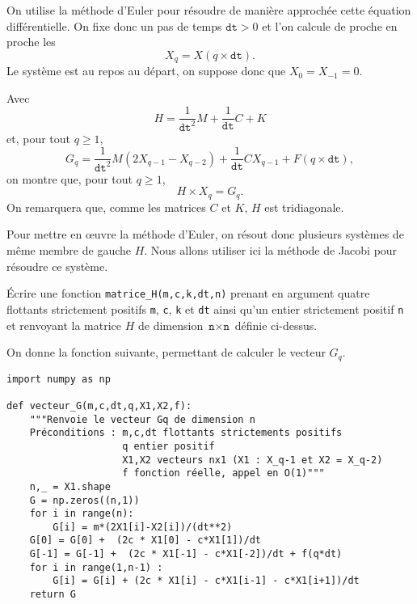On utilise la méthode d'Euler pour résoudre de manière approchée cette équation différentielle. On fixe donc un pas de temps $\texttt{dt} > 0$ et l'on calcule de proche en proche les 
\begin{equation*}
  X_q = X(q \times \texttt{dt}).
\end{equation*}
Le système est au repos au départ, on suppose donc que $X_0 = X_{-1} = 0$.

Avec
\begin{equation*}
  H = \dfrac{1}{\texttt{dt}^2} M + \dfrac{1}{\texttt{dt}}C + K
\end{equation*}
et, pour tout $q \geq 1$,
\begin{equation*}
  G_q = \dfrac{1}{\texttt{dt}^2} M (2X_{q-1} - X_{q-2}) + \dfrac{1}{\texttt{dt}}CX_{q-1} + F(q\times \texttt{dt}),
\end{equation*}
on montre que, pour tout $q \geq 1$,
\begin{equation*}
  H \times X_q = G_q.
\end{equation*}
On remarquera que, comme les matrices $C$ et $K$, $H$ est tridiagonale. 

Pour mettre en {\oe}uvre la méthode d'Euler, on résout donc plusieurs systèmes de même membre de gauche $H$. Nous allons utiliser ici la méthode de Jacobi pour résoudre ce système.

\medskip{}

\question{} Écrire une fonction \texttt{matrice\_H(m,c,k,dt,n)} prenant en argument quatre flottants strictement positifs \texttt{m}, \texttt{c}, \texttt{k} et \texttt{dt} ainsi qu'un entier strictement positif \texttt{n} et renvoyant la matrice $H$ de dimension $\texttt{n} \times \texttt{n}$ définie ci-dessus.  

\medskip{}

On donne la fonction suivante, permettant de calculer le vecteur $G_q$.
\begin{verbatim}
import numpy as np

def vecteur_G(m,c,dt,q,X1,X2,f):
    """Renvoie le vecteur Gq de dimension n
    Préconditions : m,c,dt flottants strictements positifs
                    q entier positif
                    X1,X2 vecteurs nx1 (X1 : X_q-1 et X2 = X_q-2)
                    f fonction réelle, appel en O(1)"""
    n,_ = X1.shape
    G = np.zeros((n,1))
    for i in range(n):
        G[i] = m*(2X1[i]-X2[i])/(dt**2)
    G[0] = G[0] +  (2c * X1[0] - c*X1[1])/dt
    G[-1] = G[-1] +  (2c * X1[-1] - c*X1[-2])/dt + f(q*dt)
    for i in range(1,n-1) : 
        G[i] = G[i] + (2c * X1[i] - c*X1[i-1] - c*X1[i+1])/dt
    return G
\end{verbatim}


